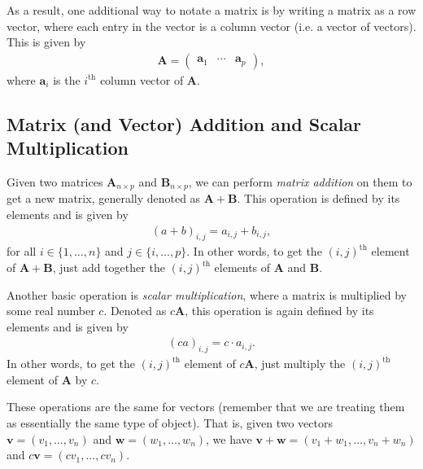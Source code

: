\documentclass[10pt]{article}
\newcommand{\mydef}[1]{\textcolor{SteelBlue3}{\textit{#1}}} %
\begin{document}
As a result, one additional way to notate a matrix is by writing a matrix as a row vector, where each entry in the vector is a column vector (i.e. a vector of vectors). This is given by 
\begin{align}
    \label{matrixvectornotation}
    \mathbf{A} = \begin{pmatrix}
        \mathbf{a}_1 & \cdots & \mathbf{a}_p
    \end{pmatrix},
\end{align}
where $\mathbf{a}_i$ is the $i^{\text{th}}$ column vector of $\mathbf{A}$. 



\subsection{Matrix (and Vector) Addition and Scalar Multiplication}

Given two matrices $\mathbf{A}_{n \times p}$ and $\mathbf{B}_{n \times p}$, we can perform \mydef{matrix addition} on them to get a new matrix, generally denoted as $\mathbf{A} + \mathbf{B}$. This operation is defined by its elements and is given by 
\begin{align}
    \label{matrixaddition}
    (a+b)_{i,j} = a_{i,j} + b_{i,j},
\end{align}
for all $i \in \{ 1,\ldots,n \}$ and $j \in \{ i,\ldots,p \}$. In other words, to get the $(i,j)^{\text{th}}$ element of $\mathbf{A} + \mathbf{B}$, just add together the $(i,j)^{\text{th}}$ elements of $\mathbf{A}$ and $\mathbf{B}$. 

Another basic operation is \mydef{scalar multiplication}, where a matrix is multiplied by some real number $c$. Denoted as $c \mathbf{A}$, this operation is again defined by its elements and is given by 
\begin{align}
    \label{scalarmultiplication}
    (c a)_{i,j} = c \cdot a_{i,j}.
\end{align}
In other words, to get the $(i,j)^{\text{th}}$ element of $c \mathbf{A}$, just multiply the $(i,j)^{\text{th}}$ element of $\mathbf{A}$ by $c$.

These operations are the same for vectors (remember that we are treating them as essentially the same type of object). That is, given two vectors $\mathbf{v} = (v_1, \ldots, v_n)$ and $\mathbf{w} = (w_1,\ldots,w_n)$, we have $\mathbf{v} + \mathbf{w} = (v_1 + w_1, \ldots, v_n + w_n)$ and $c \mathbf{v} = (cv_1, \ldots, cv_n)$.
\end{document}
